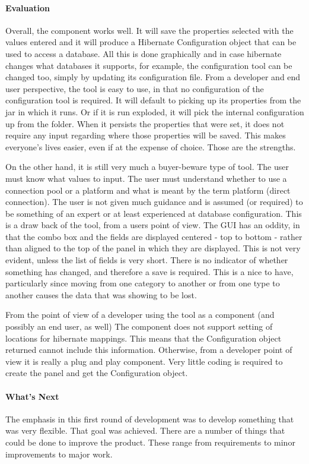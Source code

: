\paragraph{Evaluation}
Overall, the component works well. It will save the properties selected with the values entered and it will produce a Hibernate Configuration object that can be used to access a database. All this is done graphically and in case hibernate changes what databases it supports, for example, the configuration tool can be changed too, simply by updating its configuration file. From a developer and end user perspective, the tool is easy to use, in that no configuration of the configuration tool is required. It will default to picking up its properties from the jar in which it runs. Or if it is run exploded, it will pick the internal configuration up from the folder. When it persists the properties that were set, it does not require any input regarding where those properties will be saved. This makes everyone's lives easier, even if at the expense of choice. Those are the strengths. 

On the other hand, it is still very much a buyer-beware type of tool. The user must know what values to input. The user must understand whether to use a connection pool or a platform and what is meant by the term platform (direct connection). The user is not given much guidance and is assumed (or required) to be something of an expert or at least experienced at database configuration. This is a draw back of the tool, from a users point of view. The GUI has an oddity, in that the combo box and the fields are displayed centered - top to bottom - rather than aligned to the top of the panel in which they are displayed. This is not very evident, unless the list of fields is very short. There is no indicator of whether something has changed, and therefore a save is required. This is a nice to have, particularly since moving from one category to another or from one type to another causes the data that was showing to be lost.

From the point of view of a developer using the tool as a component (and possibly an end user, as well) The component does not support setting of locations for hibernate mappings. This means that the Configuration object returned cannot include this information. Otherwise, from a developer point of view it is really a plug and play component. Very little coding is required to create the panel and get the Configuration object.


\paragraph{What's Next}
The emphasis in this first round of development was to develop something that was very flexible. That goal was achieved. There are a number of things that could be done to improve the product. These range from requirements to minor improvements to major work.

